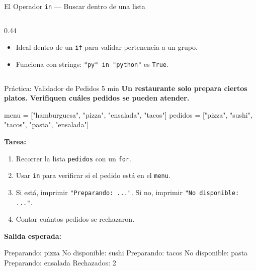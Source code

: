 \documentclass[aspectratio=169, 11pt]{beamer}
\begin{document}
\begin{frame}[fragile,shrink=35]{El Operador \texttt{in} --- Buscar dentro de una lista}
\begin{columns}[T]
\begin{column}{0.44\textwidth}
{\begin{itemize}
        \item[{\color{arcaRed}\scriptsize\faArrowRight}]
          Ideal dentro de un \texttt{if}
          para validar pertenencia a
          un grupo.

        \item[{\color{arcaRed}\scriptsize\faLightbulb}]
          Funciona con strings:
          \texttt{"py" in "python"} es
          \texttt{True}.
      \end{itemize}
      }
    \end{column}
  \end{columns}
\end{frame}

\begin{frame}[fragile,shrink=30]{Práctica: Validador de Pedidos \hfill {\normalsize\color{arcaRed}\faClock\hspace{4pt}5 min}}
  \vspace{-6pt}
  {\small\color{arcaDark}\bfseries
    Un restaurante solo prepara ciertos platos.
    Verifiquen cuáles pedidos se pueden atender.}

  \vspace{4pt}
  \begin{pyblock}
menu = ["hamburguesa", "pizza", "ensalada", "tacos"]
pedidos = ["pizza", "sushi", "tacos", "pasta", "ensalada"]
  \end{pyblock}

  \vspace{4pt}
  {\footnotesize\color{textMuted}
    \textbf{Tarea:}
    \begin{enumerate}\setlength{\itemsep}{2pt}
      \item Recorrer la lista \texttt{pedidos} con un \texttt{for}.
      \item Usar \texttt{in} para verificar si el pedido está en el \texttt{menu}.
      \item Si está, imprimir \texttt{"Preparando: ..."}.
         Si no, imprimir \texttt{"No disponible: ..."}.
      \item Contar cuántos pedidos se rechazaron.
    \end{enumerate}
  }

  \vspace{4pt}
  {\footnotesize\color{arcaDark}\bfseries Salida esperada:}
  \begin{outputblock}
Preparando: pizza
No disponible: sushi
Preparando: tacos
No disponible: pasta
Preparando: ensalada
Rechazados: 2
  \end{outputblock}
\end{frame}
\end{document}
